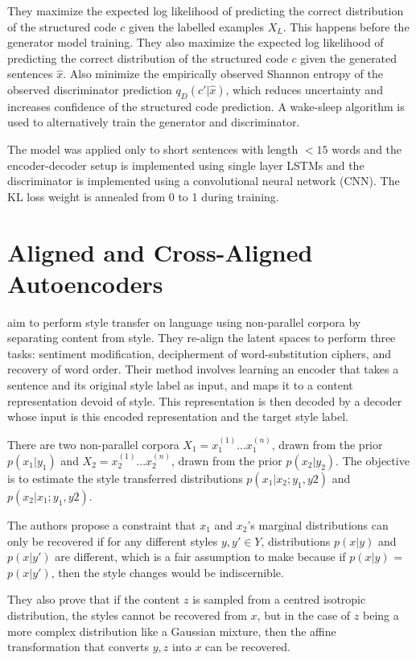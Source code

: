 They maximize the expected log likelihood of predicting the correct distribution of the structured code $c$ given the labelled examples $X_L$. This happens before the generator model training. They also maximize the expected log likelihood of predicting the correct distribution of the structured code $c$ given the generated sentences $\hat{x}$. Also minimize the empirically observed Shannon entropy of the observed discriminator prediction $q_D(c'|\hat{x})$, which reduces uncertainty and increases confidence of the structured code prediction. A wake-sleep algorithm \citep{hinton1995wake} is used to alternatively train the generator and discriminator.

The model was applied only to short sentences with length $<15$ words and the encoder-decoder setup is implemented using single layer LSTMs and the discriminator is implemented using a convolutional neural network (CNN). The KL loss weight is annealed from 0 to 1 during training.


\section{Aligned and Cross-Aligned Autoencoders}

\cite{shen2017style} aim to perform style transfer on language using non-parallel corpora by separating content from style. They re-align the latent spaces to perform three tasks: sentiment modification, decipherment of word-substitution ciphers, and recovery of word order. Their method involves learning an encoder that takes a sentence and its original style label as input, and maps it to a content representation devoid of style. This representation is then decoded by a decoder whose input is this encoded representation and the target style label.

There are two non-parallel corpora $X_1 = {x_1^{(1)} ... x_1^{(n)}}$, drawn from the prior $p(x_1|y_1)$ and $X_2 = {x_2^{(1)} ... x_2^{(n)}}$, drawn from the prior $p(x_2|y_2)$. The objective is to estimate the style transferred distributions $p(x_1|x_2;y_1,y2)$ and $p(x_2|x_1;y_1,y2)$.

The authors propose a constraint that $x_1$ and $x_2$'s marginal distributions can only be recovered if for any different styles $y, y' \in Y$, distributions $p(x|y)$ and $p(x|y')$ are different, which is a fair assumption to make because if $p(x|y)$ = $p(x|y')$, then the style changes would be indiscernible.

They also prove that if the content $z$ is sampled from a centred isotropic distribution, the styles cannot be recovered from $x$, but in the case of $z$ being a more complex distribution like a Gaussian mixture, then the affine transformation that converts $y, z$ into $x$ can be recovered.

